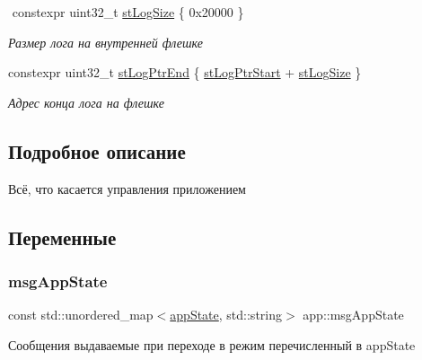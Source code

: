 \begin{DoxyCompactItemize}
$$\mbox{\label{namespaceapp_a51952c8370b735a12cf723ced096ca48}} 
constexpr uint32\+\_\+t \hyperlink{namespaceapp_a51952c8370b735a12cf723ced096ca48}{st\+Log\+Size} \{ 0x20000 \}
\begin{DoxyCompactList}\small\item\em Размер лога на внутренней флешке \end{DoxyCompactList}\item 
\mbox{\label{namespaceapp_ace31e10d9123ed3cd27682c771b31c3c}} 
constexpr uint32\+\_\+t \hyperlink{namespaceapp_ace31e10d9123ed3cd27682c771b31c3c}{st\+Log\+Ptr\+End} \{ \hyperlink{namespaceapp_a3f8e7afc758e38727589ca05d9d0b1d7}{st\+Log\+Ptr\+Start} + \hyperlink{namespaceapp_a51952c8370b735a12cf723ced096ca48}{st\+Log\+Size} \}
\begin{DoxyCompactList}\small\item\em Адрес конца лога на флешке \end{DoxyCompactList}\end{DoxyCompactItemize}


\subsection{Подробное описание}
Всё, что касается управления приложением 

\subsection{Переменные}
\mbox{\label{namespaceapp_a5731c1034c8fb7eaa43470e10aeff84c}} 
\subsubsection{\texorpdfstring{msg\+App\+State}{msgAppState}}
{\footnotesize\ttfamily const std\+::unordered\+\_\+map$<$\hyperlink{group___xD0_x9F_xD0_xB5_xD1_x80_xD0_xB5_xD1_x87_xD0_xB8_xD1_x81_xD0_xBB_xD0_xB5_xD0_xBD_xD0_xB8_xD1_x8F_ga290e8080c661e52c2f685fd4af148acf}{app\+State}, std\+::string$>$ app\+::msg\+App\+State}

Сообщения выдаваемые при переходе в режим перечисленный в app\+State 